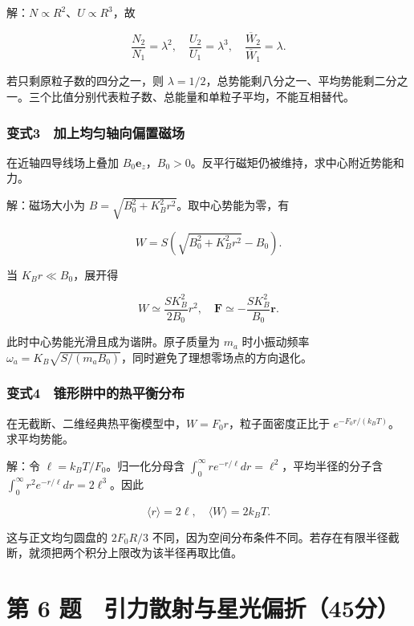 \documentclass[12pt,a4paper,fontset=fandol]{ctexart}
\begin{document}
解：\(N\propto R^2\)、\(U\propto R^3\)，故

\[\boxed{\frac{N_2}{N_1}=\lambda^2,
\quad\frac{U_2}{U_1}=\lambda^3,
\quad\frac{\overline W_2}{\overline W_1}=\lambda.}\]

若只剩原粒子数的四分之一，则
\(\lambda=1/2\)，总势能剩八分之一、平均势能剩二分之一。三个比值分别代表粒子数、总能量和单粒子平均，不能互相替代。

\subsubsection{变式3　加上均匀轴向偏置磁场}\label{ux53d8ux5f0f3-ux52a0ux4e0aux5747ux5300ux8f74ux5411ux504fux7f6eux78c1ux573a}

在近轴四导线场上叠加
\(B_0\boldsymbol e_z\)，\(B_0>0\)。反平行磁矩仍被维持，求中心附近势能和力。

解：磁场大小为 \(B=\sqrt{B_0^2+K_B^2r^2}\)。取中心势能为零，有

\[W=S(\sqrt{B_0^2+K_B^2r^2}-B_0).\]

当 \(K_Br\ll B_0\)，展开得

\[\boxed{W\simeq\frac{SK_B^2}{2B_0}r^2,
\quad\boldsymbol F\simeq-\frac{SK_B^2}{B_0}\boldsymbol r.}\]

此时中心势能光滑且成为谐阱。原子质量为 \(m_a\) 时小振动频率
\(\omega_a=K_B\sqrt{S/(m_aB_0)}\)，同时避免了理想零场点的方向退化。

\subsubsection{变式4　锥形阱中的热平衡分布}\label{ux53d8ux5f0f4-ux9525ux5f62ux9631ux4e2dux7684ux70edux5e73ux8861ux5206ux5e03}

在无截断、二维经典热平衡模型中，\(W=F_0r\)，粒子面密度正比于
\(e^{-F_0r/(k_BT)}\)。求平均势能。

解：令 \(\ell=k_BT/F_0\)。归一化分母含
\(\int_0^\infty r e^{-r/\ell}dr=\ell^2\)，平均半径的分子含
\(\int_0^\infty r^2e^{-r/\ell}dr=2\ell^3\)。因此

\[\boxed{\langle r\rangle=2\ell,
\quad\langle W\rangle=2k_BT.}\]

这与正文均匀圆盘的 \(2F_0R/3\)
不同，因为空间分布条件不同。若存在有限半径截断，就须把两个积分上限改为该半径再取比值。

\clearpage

\section{第 6
题　引力散射与星光偏折（45分）}\label{ux7b2c-6-ux9898-ux5f15ux529bux6563ux5c04ux4e0eux661fux5149ux504fux629845ux5206}
\end{document}
